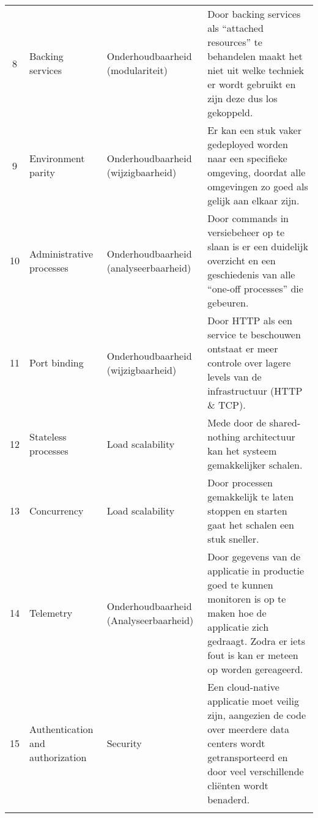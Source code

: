 \begin{longtable}[c]{c p{3cm} p{3.5cm} p{5.5cm}}
	8 & Backing services & Onderhoudbaarheid (modulariteit) & Door backing services als \enquote{attached resources} te behandelen maakt het niet uit welke techniek er wordt gebruikt en zijn deze dus los gekoppeld. \\
	9 & Environment parity & Onderhoudbaarheid (wijzigbaarheid) & Er kan een stuk vaker gedeployed worden naar een specifieke omgeving, doordat alle omgevingen zo goed als gelijk aan elkaar zijn. \\
	10 & Administrative processes & Onderhoudbaarheid (analyseerbaarheid) & Door commands in versiebeheer op te slaan is er een duidelijk overzicht en een geschiedenis van alle \enquote{one-off processes} die gebeuren. \\
	11 & Port binding & Onderhoudbaarheid (wijzigbaarheid) & Door HTTP als een service te beschouwen ontstaat er meer controle over lagere levels van de infrastructuur (HTTP \& TCP). \\
	12 & Stateless processes & Load scalability & Mede door de shared-nothing architectuur kan het systeem gemakkelijker schalen. \\
	13 & Concurrency & Load scalability & Door processen gemakkelijk te laten stoppen en starten gaat het schalen een stuk sneller. \\
	14 & Telemetry & Onderhoudbaarheid (Analyseerbaarheid) & Door gegevens van de applicatie in productie goed te kunnen monitoren is op te maken hoe de applicatie zich gedraagt. Zodra er iets fout is kan er meteen op worden gereageerd. \\
	15 & Authentication and authorization & Security & Een cloud-native applicatie moet veilig zijn, aangezien de code over meerdere data centers wordt getransporteerd en door veel verschillende cliënten wordt benaderd. \\
	\bottomrule\\
\end{longtable}

\label{Bijlagek6}